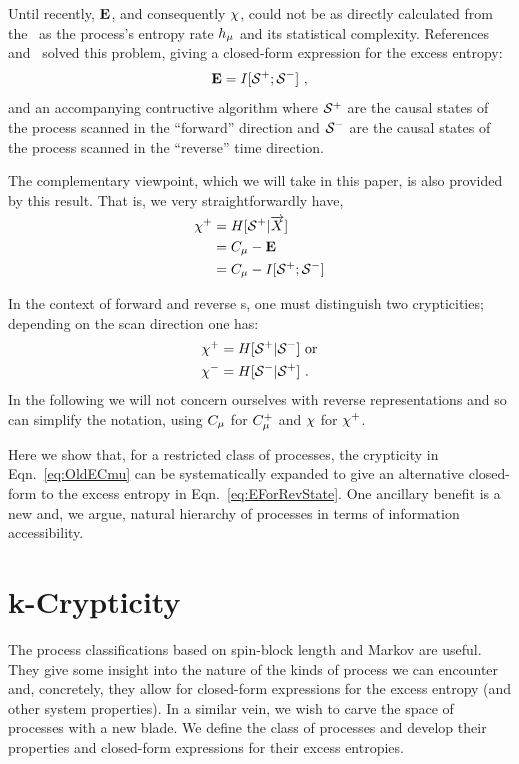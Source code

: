 Until recently, ${\bf E}$, and consequently $\chi$, could not be as directly calculated from the \eM\ as the
process's entropy rate $h_\mu$ and its statistical complexity. References~\cite{Crut08a}
and~\cite{Crut08b} solved this problem, giving a closed-form expression for
the excess entropy:
\begin{equation}
{\bf E} = I[{\mathcal{S}}^{+};{\mathcal{S}}^{-}] ~,
\label{eq:EForRevState}
\end{equation}
and an accompanying contructive algorithm where ${\mathcal{S}}^{+}$ are the causal states of the process scanned in
the ``forward'' direction and ${\mathcal{S}}^{-}$ are the causal states of
the process scanned in the ``reverse'' time direction.

The complementary viewpoint, which we will take in this paper, is also provided by this result. That is, we very straightforwardly have,
\begin{align*}
\chi^{+} &= H[{\mathcal{S}}^{+} | \smash{\overrightarrow{{X}}}]\\
&= C_\mu - {\bf E}\\
&= C_\mu - I[{\mathcal{S}}^{+} ; {\mathcal{S}}^{-}]
\end{align*}

In the context of forward and reverse \eM s, one must distinguish
two crypticities; depending on the scan direction one has:
\begin{align*}
\chi^{+} & = H[{\mathcal{S}}^{+}|{\mathcal{S}}^{-}] \text{ or}\\
\chi^{-}   & = H[{\mathcal{S}}^{-}|{\mathcal{S}}^{+}] ~.
\end{align*}
In the following we will not concern ourselves with reverse representations
and so can simplify the notation, using $C_\mu$ for $C_\mu^{+}$ and $\chi$ for
$\chi^{+}$.

Here we show that, for a restricted class of processes, the crypticity in
Eqn.~\ref{eq:OldECmu} can be systematically expanded to give an alternative
closed-form to the excess entropy in Eqn.~\ref{eq:EForRevState}. One ancillary
benefit is a new and, we argue, natural hierarchy of processes in terms of
information accessibility.

\section{k-Crypticity}

The process classifications based on spin-block length and  Markov
are useful. They give some insight into the nature of the kinds of process we
can encounter and, concretely, they allow for closed-form expressions for the
excess entropy (and other system properties). In a similar vein, we wish to
carve the space of processes with a new blade. We define the class of
\emph{} processes and develop their properties and closed-form
expressions for their excess entropies.

